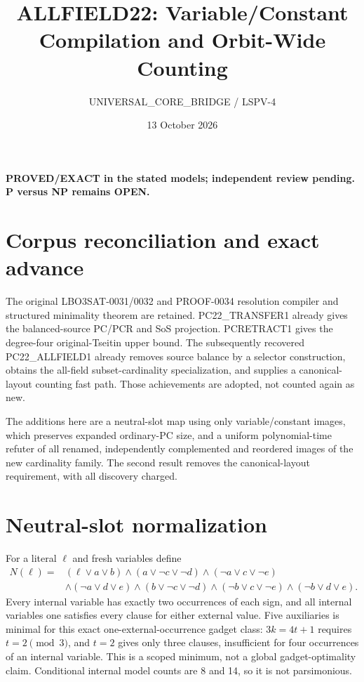 \documentclass[11pt]{article}
\title{ALLFIELD22: Variable/Constant Compilation and Orbit-Wide Counting}
\author{UNIVERSAL\_CORE\_BRIDGE / LSPV-4}
\date{13 October 2026}
\begin{document}
\maketitle
\noindent\textbf{PROVED/EXACT in the stated models; independent review pending. P versus NP remains OPEN.}

\section{Corpus reconciliation and exact advance}
The original LBO3SAT-0031/0032 and PROOF-0034 resolution compiler and structured minimality theorem are retained. PC22\_TRANSFER1 already gives the balanced-source PC/PCR and SoS projection. PCRETRACT1 gives the degree-four original-Tseitin upper bound. The subsequently recovered PC22\_ALLFIELD1 already removes source balance by a selector construction, obtains the all-field subset-cardinality specialization, and supplies a canonical-layout counting fast path. Those achievements are adopted, not counted again as new.

The additions here are a neutral-slot map using only variable/constant images, which preserves expanded ordinary-PC size, and a uniform polynomial-time refuter of all renamed, independently complemented and reordered images of the new cardinality family. The second result removes the canonical-layout requirement, with all discovery charged.

\section{Neutral-slot normalization}
For a literal $\ell$ and fresh variables define
\begin{align*}
N(\ell)={}&(\ell\lor a\lor b)\land(a\lor\neg c\lor\neg d)
\land(\neg a\lor c\lor\neg e)\\
&\land(\neg a\lor d\lor e)\land(b\lor\neg c\lor\neg d)
\land(\neg b\lor c\lor\neg e)\land(\neg b\lor d\lor e).
\end{align*}
Every internal variable has exactly two occurrences of each sign, and all internal variables one satisfies every clause for either external value. Five auxiliaries is minimal for this exact one-external-occurrence gadget class: $3k=4t+1$ requires $t=2\pmod3$, and $t=2$ gives only three clauses, insufficient for four occurrences of an internal variable. This is a scoped minimum, not a global gadget-optimality claim. Conditional internal model counts are 8 and 14, so it is not parsimonious.
\end{document}
